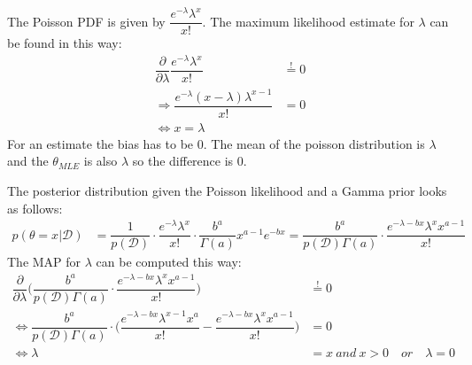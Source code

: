 \documentclass[11pt]{article}
\newcommand{\exercise}{\section{}}
\begin{document}
\exercise
The Poisson PDF is given by $\dfrac{e^{-\lambda}\lambda^x}{x!}$. The maximum likelihood estimate for $\lambda$ can be found in this way:
\begin{align*}
	\dfrac{\partial}{\partial \lambda}\dfrac{e^{-\lambda}\lambda^x}{x!} &\stackrel{!}{=} 0\\
	\Rightarrow \dfrac{e^{-\lambda}(x-\lambda)\lambda^{x-1}}{x!} &= 0\\
	\iff x = \lambda
\end{align*}
For an estimate the bias has to be 0. The mean of the poisson distribution is $\lambda$ and the $\theta_{MLE}$ is also $\lambda$ so the difference is 0.

\noindent The posterior distribution given the Poisson likelihood and a Gamma prior looks as follows:
\begin{align*}
	p(\theta=x|\mathcal{D}) &= \dfrac{1}{p(\mathcal{D})} \cdot \dfrac{e^{-\lambda}\lambda^x}{x!} \cdot \dfrac{b^a}{\Gamma(a)}x^{a-1}e^{-bx} = \dfrac{b^a}{p(\mathcal{D})\Gamma(a)} \cdot \dfrac{e^{-\lambda-bx}\lambda^x x^{a-1}}{x!}
\end{align*}
The MAP for $\lambda$ can be computed this way:
\begin{align*}
	\dfrac{\partial}{\partial \lambda}\Big(\dfrac{b^a}{p(\mathcal{D})\Gamma(a)} \cdot \dfrac{e^{-\lambda-bx}\lambda^x x^{a-1}}{x!}\Big) &\stackrel{!}{=} 0\\
	\iff \dfrac{b^a}{p(\mathcal{D})\Gamma(a)} \cdot \Big(\dfrac{e^{-\lambda-bx} \lambda^{x-1} x^{a}}{x!} - \dfrac{e^{-\lambda-bx} \lambda^{x} x^{a-1}}{x!} \Big) &= 0\\
	\iff \lambda&=x\ and\ x>0 \quad or\quad \lambda = 0
\end{align*}
\end{document}
